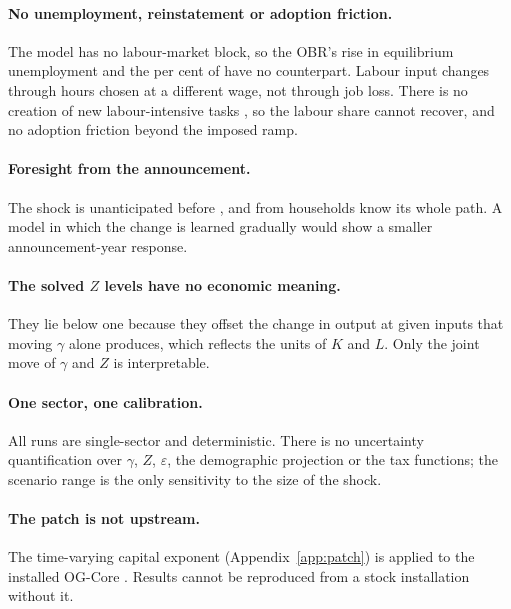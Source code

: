 \paragraph{No unemployment, reinstatement or adoption friction.} The model has no labour-market block, so the OBR's rise in equilibrium unemployment and the \genKorinekTableUnemploymentPct{} per cent of \citet{korinek2026} have no counterpart. Labour input changes through hours chosen at a different wage, not through job loss. There is no creation of new labour-intensive tasks \citep{acemoglu2018}, so the labour share cannot recover, and no adoption friction beyond the imposed ramp.

\paragraph{Foresight from the announcement.} The shock is unanticipated before \genShockYear{}, and from \genShockYear{} households know its whole path. A model in which the change is learned gradually would show a smaller announcement-year response.

\paragraph{The solved $Z$ levels have no economic meaning.} They lie below one because they offset the change in output at given inputs that moving $\gamma$ alone produces, which reflects the units of $K$ and $L$. Only the joint move of $\gamma$ and $Z$ is interpretable.

\paragraph{One sector, one calibration.} All runs are single-sector and deterministic. There is no uncertainty quantification over $\gamma$, $Z$, $\varepsilon$, the demographic projection or the tax functions; the scenario range is the only sensitivity to the size of the shock.

\paragraph{The patch is not upstream.} The time-varying capital exponent (Appendix~\ref{app:patch}) is applied to the installed OG-Core \genOgcoreVersion{}. Results cannot be reproduced from a stock installation without it.
